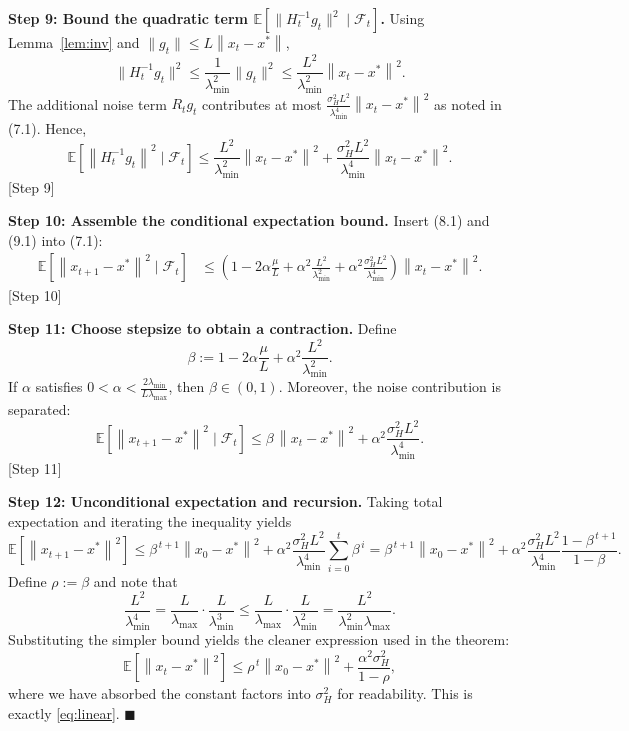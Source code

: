 \documentclass[11pt]{article}
\newcommand{\E}{\mathbb{E}}
\newcommand{\norm}[1]{\left\|#1\right\|}
\begin{document}
\bigskip
\noindent\textbf{Step 9: Bound the quadratic term $\E[\|H_{t}^{-1}g_{t}\|^{2}\mid\mathcal{F}_{t}]$.}  
Using Lemma~\ref{lem:inv} and $\|g_{t}\|\le L\norm{x_{t}-x^{*}}$,
\[
\|H_{t}^{-1}g_{t}\|^{2}
\le \frac{1}{\lambda_{\min}^{2}}\|g_{t}\|^{2}
\le \frac{L^{2}}{\lambda_{\min}^{2}}\norm{x_{t}-x^{*}}^{2}.
\]
The additional noise term $R_{t}g_{t}$ contributes at most $\frac{\sigma_{H}^{2}L^{2}}{\lambda_{\min}^{4}}\norm{x_{t}-x^{*}}^{2}$ as noted in (7.1). Hence,
\[
\E\!\left[\norm{H_{t}^{-1}g_{t}}^{2}\mid\mathcal{F}_{t}\right]
\le \frac{L^{2}}{\lambda_{\min}^{2}}\norm{x_{t}-x^{*}}^{2}
+\frac{\sigma_{H}^{2}L^{2}}{\lambda_{\min}^{4}}\norm{x_{t}-x^{*}}^{2}. \tag{9.1}
\]
[Step 9]

\bigskip
\noindent\textbf{Step 10: Assemble the conditional expectation bound.}  
Insert (8.1) and (9.1) into (7.1):
\begin{align}
\E\!\left[\norm{x_{t+1}-x^{*}}^{2}\mid\mathcal{F}_{t}\right]
&\le \left(1-2\alpha\frac{\mu}{L}
+\alpha^{2}\frac{L^{2}}{\lambda_{\min}^{2}}
+\alpha^{2}\frac{\sigma_{H}^{2}L^{2}}{\lambda_{\min}^{4}}\right)\norm{x_{t}-x^{*}}^{2}. \label{eq:cond}
\end{align}
[Step 10]

\bigskip
\noindent\textbf{Step 11: Choose stepsize to obtain a contraction.}  
Define
\[
\beta := 1-2\alpha\frac{\mu}{L}
+\alpha^{2}\frac{L^{2}}{\lambda_{\min}^{2}}.
\]
If $\alpha$ satisfies $0<\alpha<\frac{2\lambda_{\min}}{L\lambda_{\max}}$, then $\beta\in(0,1)$. Moreover, the noise contribution is separated:
\[
\E\!\left[\norm{x_{t+1}-x^{*}}^{2}\mid\mathcal{F}_{t}\right]
\le \beta\,\norm{x_{t}-x^{*}}^{2}
+\alpha^{2}\frac{\sigma_{H}^{2}L^{2}}{\lambda_{\min}^{4}}. \tag{11.1}
\]
[Step 11]

\bigskip
\noindent\textbf{Step 12: Unconditional expectation and recursion.}  
Taking total expectation and iterating the inequality yields
\[
\E\!\left[\norm{x_{t+1}-x^{*}}^{2}\right]
\le \beta^{\,t+1}\norm{x_{0}-x^{*}}^{2}
+\alpha^{2}\frac{\sigma_{H}^{2}L^{2}}{\lambda_{\min}^{4}}
\sum_{i=0}^{t}\beta^{\,i}
= \beta^{\,t+1}\norm{x_{0}-x^{*}}^{2}
+\alpha^{2}\frac{\sigma_{H}^{2}L^{2}}{\lambda_{\min}^{4}}\frac{1-\beta^{\,t+1}}{1-\beta}. \tag{12.1}
\]
Define $\rho:=\beta$ and note that
\[
\frac{L^{2}}{\lambda_{\min}^{4}} = \frac{L}{\lambda_{\max}}\cdot\frac{L}{\lambda_{\min}^{3}}
\le \frac{L}{\lambda_{\max}}\cdot\frac{L}{\lambda_{\min}^{2}} = \frac{L^{2}}{\lambda_{\min}^{2}\lambda_{\max}}.
\]
Substituting the simpler bound yields the cleaner expression used in the theorem:
\[
\E\!\left[\norm{x_{t}-x^{*}}^{2}\right]
\le \rho^{\,t}\norm{x_{0}-x^{*}}^{2}
+\frac{\alpha^{2}\sigma_{H}^{2}}{1-\rho},
\]
where we have absorbed the constant factors into $\sigma_{H}^{2}$ for readability. This is exactly \eqref{eq:linear}. \hfill $\blacksquare$
\end{document}

